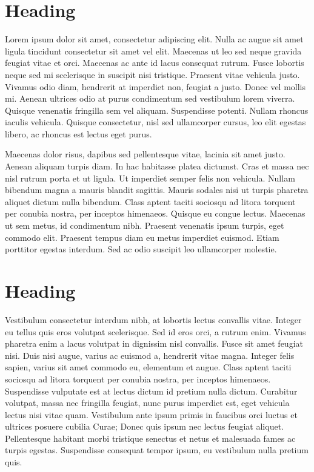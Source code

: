 \documentclass[10pt,a4paper]{article}
\begin{document}
\begin{multicols}{2}
\section{Heading}
Lorem ipsum dolor sit amet, consectetur adipiscing elit. Nulla ac augue sit amet ligula tincidunt consectetur sit amet vel elit. Maecenas ut leo sed neque gravida feugiat vitae et orci. Maecenas ac ante id lacus consequat rutrum. Fusce lobortis neque sed mi scelerisque in suscipit nisi tristique. Praesent vitae vehicula justo. Vivamus odio diam, hendrerit at imperdiet non, feugiat a justo. Donec vel mollis mi. Aenean ultrices odio at purus condimentum sed vestibulum lorem viverra. Quisque venenatis fringilla sem vel aliquam. Suspendisse potenti. Nullam rhoncus iaculis vehicula. Quisque consectetur, nisl sed ullamcorper cursus, leo elit egestas libero, ac rhoncus est lectus eget purus.

Maecenas dolor risus, dapibus sed pellentesque vitae, lacinia sit amet justo. Aenean aliquam turpis diam. In hac habitasse platea dictumst. Cras et massa nec nisl rutrum porta et ut ligula. Ut imperdiet semper felis non vehicula. Nullam bibendum magna a mauris blandit sagittis. Mauris sodales nisi ut turpis pharetra aliquet dictum nulla bibendum. Class aptent taciti sociosqu ad litora torquent per conubia nostra, per inceptos himenaeos. Quisque eu congue lectus. Maecenas ut sem metus, id condimentum nibh. Praesent venenatis ipsum turpis, eget commodo elit. Praesent tempus diam eu metus imperdiet euismod. Etiam porttitor egestas interdum. Sed ac odio suscipit leo ullamcorper molestie.

\section{Heading}
Vestibulum consectetur interdum nibh, at lobortis lectus convallis vitae. Integer eu tellus quis eros volutpat scelerisque. Sed id eros orci, a rutrum enim. Vivamus pharetra enim a lacus volutpat in dignissim nisl convallis. Fusce sit amet feugiat nisi. Duis nisi augue, varius ac euismod a, hendrerit vitae magna. Integer felis sapien, varius sit amet commodo eu, elementum et augue. Class aptent taciti sociosqu ad litora torquent per conubia nostra, per inceptos himenaeos. Suspendisse vulputate est at lectus dictum id pretium nulla dictum. Curabitur volutpat, massa nec fringilla feugiat, nunc purus imperdiet est, eget vehicula lectus nisi vitae quam. Vestibulum ante ipsum primis in faucibus orci luctus et ultrices posuere cubilia Curae; Donec quis ipsum nec lectus feugiat aliquet. Pellentesque habitant morbi tristique senectus et netus et malesuada fames ac turpis egestas. Suspendisse consequat tempor ipsum, eu vestibulum nulla pretium quis.


\end{multicols}
\end{document}
